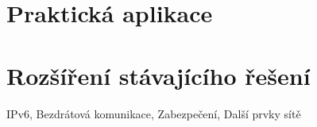 \chapter{Praktická aplikace}

\chapter{Rozšíření stávajícího řešení}
IPv6, Bezdrátová komunikace, Zabezpečení, Další prvky sítě